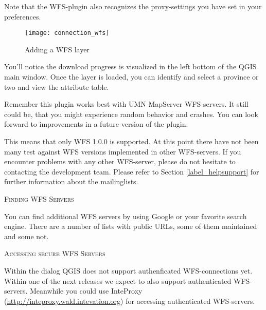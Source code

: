 Note that the WFS-plugin also recognizes the proxy-settings you have set
in your preferences.

\begin{figure}[ht]
  \centering
  	\texttt{[image: connection\_wfs]}
  	\caption{Adding a WFS layer \nixcaption}\label{fig:wfs_dmsolutions}
\end{figure}

You'll notice the download progress is visualized in the left bottom of the QGIS main window. 
Once the layer is loaded, you can identify and select a province or two and view the 
attribute table.

Remember this plugin works best with UMN MapServer WFS servers. It still
could be, that you might experience random behavior 
and crashes. You can look forward to improvements in a future version of the plugin.

This means that only WFS 1.0.0 is supported. At this point there have not
been many test against WFS versions implemented in other WFS-servers.
If you encounter problems with any other WFS-server, please do not
hesitate to contacting the development team. Please refer to Section 
\ref{label_helpsupport} for further information about the mailinglists.

\begin{Tip}[htb]\caption{\textsc{Finding WFS Servers}}
You can find additional WFS servers by using Google or your
favorite search engine. There are a number of lists with public URLs, some 
of them maintained and some not.
\end{Tip} 

\begin{Tip}[htb]\caption{\textsc{Accessing secure WFS Servers}}
Within the dialog  QGIS does not support 
authenficated WFS-connections yet. Within one of the next releases we expect 
to also support authenticated WFS-servers. Meanwhile you could use InteProxy
(\url{http://inteproxy.wald.intevation.org}) for accessing authenticated
WFS-servers.
\end{Tip}

\FloatBarrier
